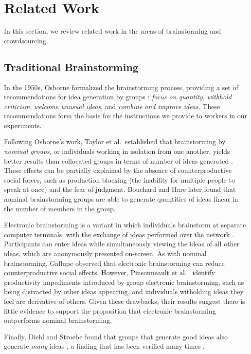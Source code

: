 \section{Related Work}
In this section, we review related work in the areas of brainstorming and crowdsourcing.

\subsection{Traditional Brainstorming}
In the 1950s, Osborne formalized the brainstorming process, providing a set of recommendations for idea generation by groups \cite{osborn_applied_1957}: \emph{focus on quantity}, \emph{withhold criticism}, \emph{welcome unusual ideas}, and \emph{combine and improve ideas}. These recommendations form the basis for the instructions we provide to workers in our experiments.

Following Osborne's work, Taylor et al.\ established that brainstorming by \emph{nominal groups}, or individuals working in isolation from one another, yields better results than collocated groups in terms of number of ideas generated \cite{taylor_does_1958}. These effects can be partially explained by the absence of counterproductive social forces, such as production blocking (the inability for multiple people to speak at once) and the fear of judgment. Bouchard and Hare \cite{bouchard_jr_size_1970} later found that nominal brainstorming groups are able to generate quantities of ideas linear in the number of members in the group.

Electronic brainstorming is a variant in which individuals brainstorm at separate computer terminals, with the exchange of ideas performed over the network \cite{gallupe_electronic_1992}. Participants can enter ideas while simultaneously viewing the ideas of all other ideas, which are anonymously presented on-screen. As with nominal brainstorming, Gallupe \cite{gallupe_electronic_1992} observed that electronic brainstorming can reduce counterproductive social effects. However, Pinsonneault et al.\ \cite{pinsonneault_electronic_1999} identify productivity impediments introduced by group electronic brainstorming, such as being distracted by other ideas appearing, and individuals witholding ideas they feel are derivative of others. Given these drawbacks, their results suggest there is little evidence to support the proposition that electronic brainstorming outperforms nominal brainstorming.

Finally, Diehl and Stroebe found that groups that generate good ideas also generate \emph{many} ideas \cite{diehl_productivity_1987}, a finding that has been verified many times \cite{briggs1997quality, parnes1959effects, parnes_effects_1961, shah2003metrics, cross1996creativity}.

